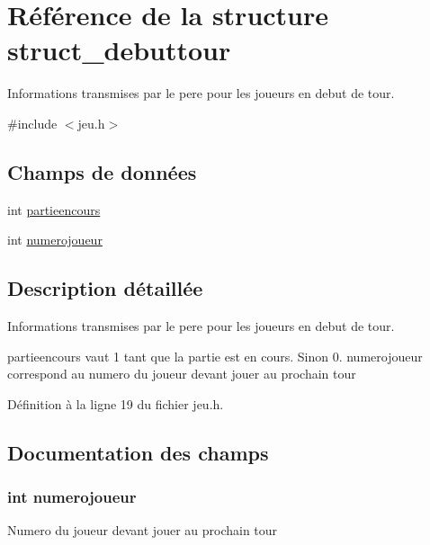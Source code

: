 \hypertarget{structstruct__debuttour}{\section{Référence de la structure struct\-\_\-debuttour}
\label{structstruct__debuttour}
}


Informations transmises par le pere pour les joueurs en debut de tour.  




{\ttfamily \#include $<$jeu.\-h$>$}

\subsection*{Champs de données}
\begin{DoxyCompactItemize}
\item 
int \hyperlink{structstruct__debuttour_ae1ce459099bf548d3ae61f39c892ebbe}{partieencours}
\item 
int \hyperlink{structstruct__debuttour_a3e4028dc4a9077afc6e53e423343bd70}{numerojoueur}
\end{DoxyCompactItemize}


\subsection{Description détaillée}
Informations transmises par le pere pour les joueurs en debut de tour. 

partieencours vaut 1 tant que la partie est en cours. Sinon 0. numerojoueur correspond au numero du joueur devant jouer au prochain tour 

Définition à la ligne 19 du fichier jeu.\-h.



\subsection{Documentation des champs}
\hypertarget{structstruct__debuttour_a3e4028dc4a9077afc6e53e423343bd70}{
\subsubsection[{numerojoueur}]{\setlength{\rightskip}{0pt plus 5cm}int numerojoueur}}\label{structstruct__debuttour_a3e4028dc4a9077afc6e53e423343bd70}
Numero du joueur devant jouer au prochain tour 

